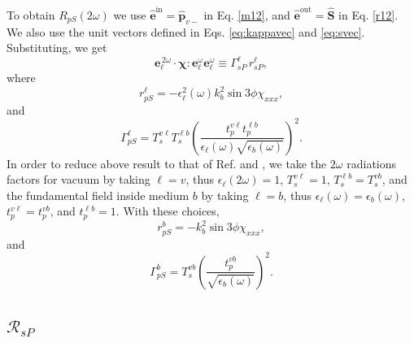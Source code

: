 To obtain $R_{pS}(2\omega)$ we use
$\hat{\mathbf{e}}^{\mathrm{in}}=\hat{\mathbf{p}}_{v-}$ in Eq. \eqref{m12}, and
$\hat{\mathbf{e}}^{\mathrm{out}}=\hat{\mathbf{S}}$ in Eq. \eqref{r12}. We also
use the unit vectors defined in Eqs. \eqref{eq:kappavec} and
\eqref{eq:svec}. Substituting, we get
\begin{equation*}
\mathbf{e}^{\,2\omega}_{\ell}\cdot
\boldsymbol{\chi}:\mathbf{e}^\omega_{\ell}\mathbf{e}^\omega_{\ell}
\equiv\Gamma^{\ell}_{sP}\, r^{\ell}_{sP},
\end{equation*}
where
\begin{equation}
r^{\ell}_{pS}
= -\epsilon^{2}_{\ell}(\omega)k^{2}_{b}\sin3\phi\chi_{xxx},
\end{equation} 
and  
\begin{equation}
\Gamma^{\ell}_{pS} =
T^{v\ell}_{s}T^{\ell b}_{s}\left(\frac{t^{v\ell}_{p}t^{\ell b}_{p}}
      {\epsilon_{\ell}(\omega)\sqrt{\epsilon_{b}(\omega)}}\right)^{2}.
\end{equation} 
In order to reduce above result to that of Ref. \cite{mizrahiJOSA88} and
\cite{sipePRB87},  we take the $2\omega$ radiations factors for vacuum by
taking $\ell=v$, thus $\epsilon_{\ell}(2\omega)=1$, $T^{v\ell}_{s}=1$,
$T^{\ell b}_{s}=T^{vb}_{s}$, and the fundamental field inside medium $b$ by
taking $\ell=b$, thus $\epsilon_{\ell}(\omega)=\epsilon_{b}(\omega)$,
$t^{v\ell}_{p}=t^{vb}_{p}$, and $t^{\ell b}_{p}=1$. With these choices,
\begin{equation*}
r^{b}_{pS} = -k^{2}_{b}\sin3\phi\chi_{xxx},
\end{equation*} 
and 
\begin{equation*}
\Gamma^{b}_{pS} =
T^{vb}_{s}
\left(
\frac{t^{vb}_{p}}{\sqrt{\epsilon_{b}(\omega)}}
\right)^{2}.  
\end{equation*} 


\subsection{\texorpdfstring{$\mathcal{R}_{sP}$}{RsP}}

